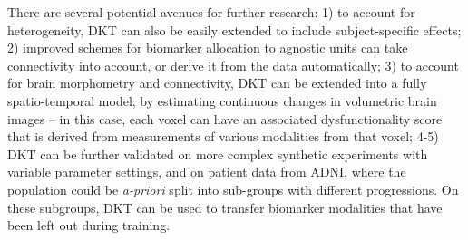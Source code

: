 \documentclass{llncs}
\begin{document}
There are several potential avenues for further research: 1) to account for heterogeneity, DKT can also be easily extended to include subject-specific effects; 2) improved schemes for biomarker allocation to agnostic units can take connectivity into account, or derive it from the data automatically; 3) to account for brain morphometry and connectivity, DKT can be extended into a fully spatio-temporal model, by estimating continuous changes in volumetric brain images -- in this case, each voxel can have an associated dysfunctionality score that is derived from measurements of various modalities from that voxel; 4-5) DKT can be further validated on more complex synthetic experiments with variable parameter settings, and on patient data from ADNI, where the population could be \emph{a-priori} split into sub-groups with different progressions. On these subgroups, DKT can be used to transfer biomarker modalities that have been left out during training.

%
\end{document}

